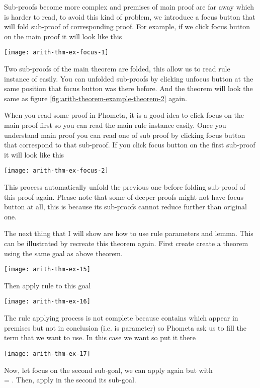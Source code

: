\documentclass[master.tex]{subfiles}
\begin{document}
Sub-proofs become more complex and premises of main proof are far away which
is harder to read, to avoid this kind of problem, we introduce a focus button
that will fold sub-proof of corresponding proof. For example, if we click
focus button on the main proof it will look like this

\texttt{[image: arith-thm-ex-focus-1]}

Two sub-proofs of the main theorem are folded, this allow us to read rule
instance of  easily. You can unfolded sub-proofs by clicking
unfocus button at the same position that focus button was there before. And the
theorem will look the same as figure \ref{fig:arith-theorem-example-theorem-2}
again.

When you read some proof in Phometa, it is a good idea to click focus on the
main proof first so you can read the main rule instance easily. Once you
understand main proof you can read one of sub proof by clicking focus button
that correspond to that sub-proof. If you click focus button on the first
sub-proof it will look like this

\texttt{[image: arith-thm-ex-focus-2]}

This process automatically unfold the previous one before folding sub-proof
of this proof again. Please note that some of deeper proofs might not have
focus button at all, this is because its sub-proofs cannot reduce further than
original one.

The next thing that I will show are how to use rule parameters and lemma. This
can be illustrated by recreate this theorem again. First create create a theorem
 using the same goal as above theorem.

\texttt{[image: arith-thm-ex-15]}

Then apply rule  to this goal

\texttt{[image: arith-thm-ex-16]}

The rule applying process is not complete because  contains
 which appear in premises but not in conclusion (i.e.  is
parameter) so Phometa ask us to fill the term that we want to use. In this case
we want  so put it there

\texttt{[image: arith-thm-ex-17]}

Now, let focus on the second sub-goal, we can apply  again but
with \\  = . Then, apply  in the second its sub-goal.
\end{document}
